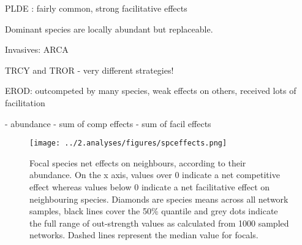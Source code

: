 \documentclass[a4,12pt]{article}
\begin{document}
    PLDE : fairly common, strong facilitative effects

    Dominant species are locally abundant but replaceable. 

    Invasives: ARCA

    TRCY and TROR - very different strategies!

    EROD: outcompeted by many species, weak effects on others, received lots of facilitation

 - abundance - sum of comp effects - sum of facil effects

    \begin{figure}[H]
        \hspace*{-1cm}
        \texttt{[image: ../2.analyses/figures/spceffects.png]}
        \caption{Focal species net effects on neighbours, according to their abundance. On the x axis, values over 0 indicate a net competitive effect whereas values below 0 indicate a net facilitative effect on neighbouring species. Diamonds are species means across all network samples, black lines cover the 50\% quantile and grey dots indicate the full range of out-strength values as calculated from 1000 sampled networks. Dashed lines represent the median value for focals.}
        \label{fig:species}
    \end{figure} 

   





    

    

\end{document}
